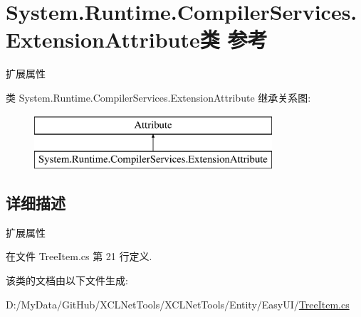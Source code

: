 \hypertarget{class_system_1_1_runtime_1_1_compiler_services_1_1_extension_attribute}{}\section{System.\+Runtime.\+Compiler\+Services.\+Extension\+Attribute类 参考}
\label{class_system_1_1_runtime_1_1_compiler_services_1_1_extension_attribute}


扩展属性  


类 System.\+Runtime.\+Compiler\+Services.\+Extension\+Attribute 继承关系图\+:\begin{figure}[H]
\begin{center}
\leavevmode
\includegraphics[height=2.000000cm]{class_system_1_1_runtime_1_1_compiler_services_1_1_extension_attribute}
\end{center}
\end{figure}


\subsection{详细描述}
扩展属性 



在文件 Tree\+Item.\+cs 第 21 行定义.



该类的文档由以下文件生成\+:\begin{DoxyCompactItemize}
\item 
D\+:/\+My\+Data/\+Git\+Hub/\+X\+C\+L\+Net\+Tools/\+X\+C\+L\+Net\+Tools/\+Entity/\+Easy\+U\+I/\hyperlink{_tree_item_8cs}{Tree\+Item.\+cs}\end{DoxyCompactItemize}
